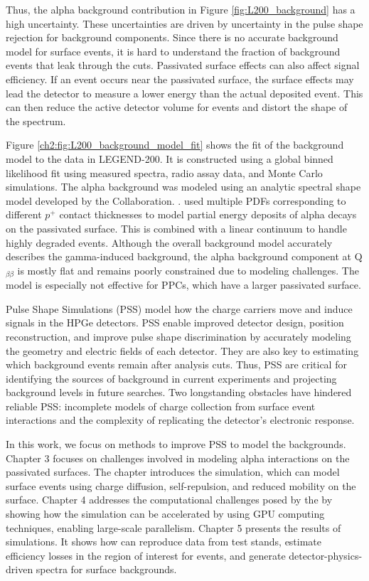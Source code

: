 Thus, the alpha background contribution in Figure \ref{fig:L200_background} has a high uncertainty. These uncertainties are driven by uncertainty in the pulse shape rejection for background components. Since there is no accurate background model for surface events, it is hard to understand the fraction of background events that leak through the cuts. Passivated surface effects can also affect signal efficiency. If an event occurs near the passivated surface, the surface effects may lead the detector to measure a lower energy than the actual deposited event. This can then reduce the active detector volume for {\onbb} events and distort the shape of the {\tnbb} spectrum. 

Figure \ref{ch2:fig:L200_background_model_fit} shows the fit of the background model to the data in LEGEND-200. It is constructed using a global binned likelihood fit using measured spectra, radio assay data, and Monte Carlo simulations. The alpha background was modeled using an analytic spectral shape model developed by the {\Gerda} Collaboration. \cite{GERDA_2019cav}. {\Gerda} used multiple PDFs corresponding to different $p^+$ contact thicknesses to model partial energy deposits of alpha decays on the passivated surface. This is combined with a linear continuum to handle highly degraded events. Although the overall background model accurately describes the gamma-induced background, the alpha background component at Q$_{\beta \beta}$ is mostly flat and remains poorly constrained due to modeling challenges. The {\Gerda} model is especially not effective for {\MJ} PPCs, which have a larger passivated surface.

Pulse Shape Simulations (PSS) model how the charge carriers move and induce signals in the HPGe detectors. PSS enable improved detector design, position reconstruction, and improve pulse shape discrimination by accurately modeling the geometry and electric fields of each detector. They are also key to estimating which background events remain after analysis cuts. Thus, PSS are critical for identifying the sources of background in current experiments and projecting background levels in future searches. Two longstanding obstacles have hindered reliable PSS: incomplete models of charge collection from surface event interactions and the complexity of replicating the detector’s electronic response.

In this work, we focus on methods to improve PSS to model the backgrounds. Chapter 3 focuses on challenges involved in modeling alpha interactions on the passivated surfaces. The chapter introduces the {\ehd} simulation, which can model surface events using charge diffusion, self-repulsion, and reduced mobility on the surface. Chapter 4 addresses the computational challenges posed by the {\ehd} by showing how the simulation can be accelerated by using GPU computing techniques, enabling large-scale parallelism. Chapter 5 presents the results of {\ehd} simulations. It shows how {\ehd} can reproduce data from test stands, estimate efficiency losses in the region of interest for {\onbb} events, and generate detector-physics-driven spectra for surface backgrounds.

